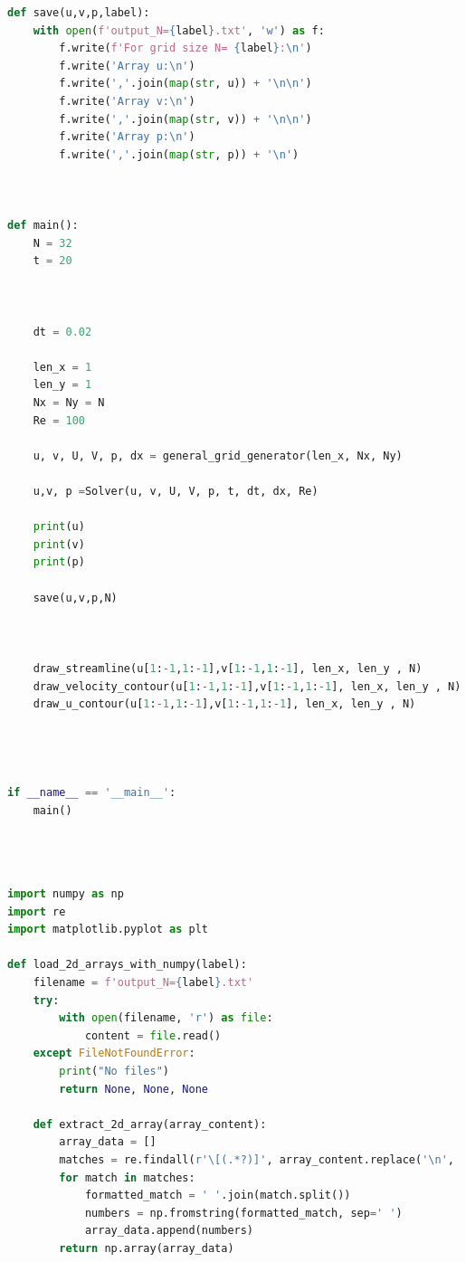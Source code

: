 \documentclass[12pt]{article}
\begin{document}
\begin{scriptsize}
\begin{lstlisting}[language=python,caption={Lid Driven Cavity Solver}]
def save(u,v,p,label):
    with open(f'output_N={label}.txt', 'w') as f:
        f.write(f'For grid size N= {label}:\n')
        f.write('Array u:\n')  
        f.write(','.join(map(str, u)) + '\n\n')  
        f.write('Array v:\n')  
        f.write(','.join(map(str, v)) + '\n\n')  
        f.write('Array p:\n')  
        f.write(','.join(map(str, p)) + '\n')  



def main():
    N = 32
    t = 20



    dt = 0.02

    len_x = 1
    len_y = 1
    Nx = Ny = N
    Re = 100

    u, v, U, V, p, dx = general_grid_generator(len_x, Nx, Ny)

    u,v, p =Solver(u, v, U, V, p, t, dt, dx, Re)

    print(u)
    print(v)
    print(p)

    save(u,v,p,N)
    

    
    draw_streamline(u[1:-1,1:-1],v[1:-1,1:-1], len_x, len_y , N)
    draw_velocity_contour(u[1:-1,1:-1],v[1:-1,1:-1], len_x, len_y , N)
    draw_u_contour(u[1:-1,1:-1],v[1:-1,1:-1], len_x, len_y , N)




if __name__ == '__main__':
    main()





\end{lstlisting}





\begin{lstlisting}[language=python,caption={Post Operator:}]
import numpy as np
import re
import matplotlib.pyplot as plt

def load_2d_arrays_with_numpy(label):
    filename = f'output_N={label}.txt'
    try:
        with open(filename, 'r') as file:
            content = file.read()
    except FileNotFoundError:
        print("No files")
        return None, None, None

    def extract_2d_array(array_content):
        array_data = []
        matches = re.findall(r'\[(.*?)]', array_content.replace('\n', ''), re.DOTALL)
        for match in matches:
            formatted_match = ' '.join(match.split())
            numbers = np.fromstring(formatted_match, sep=' ')
            array_data.append(numbers)
        return np.array(array_data)


\end{lstlisting}
\end{scriptsize}
\end{document}
